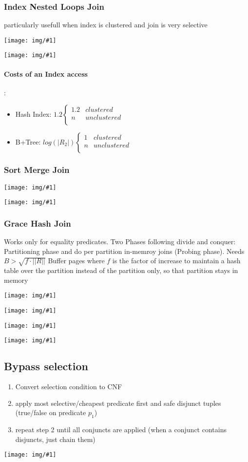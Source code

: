 \documentclass[a4paper]{article}
\newcommand{\img}[1]{\begin{center}
    \texttt{[image: img/\#1]}
\end{center} }
\begin{document}
\begin{twocolumn}
\subsubsection{Index Nested Loops Join}
particularly usefull when index is clustered and join is very selective \\
\img{inl_algo}
\img{inl_cost}

\paragraph{Costs of an Index access}: \\
\begin{itemize}
	\item Hash Index: $1.2 \begin{cases} 
	1.2 & clustered \\
	n & unclustered \\
	\end{cases}$
	\item B+Tree:  $log(|R_2|) \begin{cases} 
	1 & clustered \\
	n & unclustered \\
	\end{cases}$
\end{itemize}

\subsubsection{Sort Merge Join}

\img{smj_algo}
\img{smj_costs}


\subsubsection{Grace Hash Join}
Works only for equality predicates. Two Phases following divide and conquer: Partitioning phase and do per partition in-memroy joins (Probing phase). Needs $B > \sqrt{f \cdot ||R||}$ Buffer pages where $f$ is the factor of increase to maintain a hash table over the partition instead of the partition only, so that partition stays in memory
\img{ghj_part}
\img{ghj_probe}
\img{ghj_algo}
\img{ghj_costs}

\subsection{Bypass selection} 
\begin{enumerate}
	\item Convert selection condition to CNF
	\item apply most selective/cheapest predicate first and safe disjunct tuples (true/false on predicate $p_1$) 
	\item repeat step 2 until all conjuncts are applied (when a conjunct contains disjuncts, just chain them)
\end{enumerate}
\img{selection_bypass}



\end{twocolumn}
\end{document}
